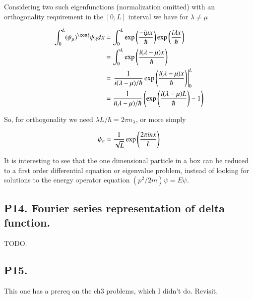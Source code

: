 \documentclass{article}
\begin{document}
Considering two such eigenfunctions (normalization omitted) with an orthogonality requirement in the $[0,L]$ interval we have for $\lambda \ne \mu$

\begin{align*}
\int_0^L (\psi_\mu)^\conj \psi_\lambda dx 
&=
\int_0^L 
\exp\left( \frac{-i \mu x }{\hbar} \right) \exp\left( \frac{i \lambda x }{\hbar} \right) \\
&=
\int_0^L \exp\left( \frac{i (\lambda -\mu) x }{\hbar} \right) \\
&=
\left. \inv{ i (\lambda -\mu)/\hbar} \exp\left( \frac{i (\lambda -\mu) x }{\hbar} \right) \right\vert_{0}^L
 \\
&=
\inv{ i (\lambda -\mu)/\hbar} \left( \exp\left( \frac{i (\lambda -\mu) L }{\hbar} \right) - 1 \right)
 \\
\end{align*}

So, for orthogonality we need $\lambda L/\hbar = 2\pi n_\lambda$, or more simply

\begin{align*}
\psi_n = \frac{1}{\sqrt{L}} \exp\left( \frac{ 2 \pi i n x }{L } \right) \\
\end{align*}

It is interesting to see that the one dimensional particle in a box can be reduced to a first order differential equation or 
eigenvalue problem, instead of looking for solutions to the energy operator equation $(p^2/2m) \psi = E \psi$.

\subsection{ P14. Fourier series representation of delta function. }

TODO.

\subsection{ P15. }

This one has a prereq on the ch3 problems, which I didn't do.  Revisit.



\end{document}
